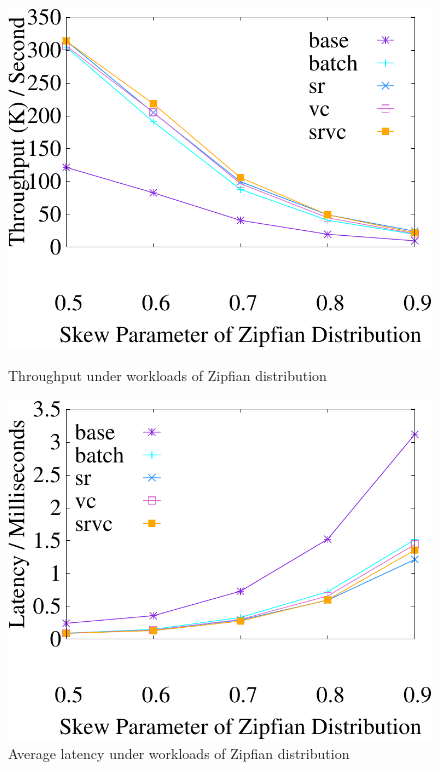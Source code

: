 \begin{figure}[t]
	\centering
	\begin{minipage}[b]{0.31\linewidth}
	\centering
	\includegraphics[width=\textwidth]{./exp_fig/basic/tps}
	\caption{Throughput under workloads of Zipfian distribution}
	\label{fig:basic:tps}
	\end{minipage}    
    \begin{minipage}[b]{0.31\linewidth}
    	\centering
    	\includegraphics[width=\textwidth]{./exp_fig/basic/latency}
    	\caption{Average latency under workloads of Zipfian distribution}

\end{minipage}
\end{figure}

